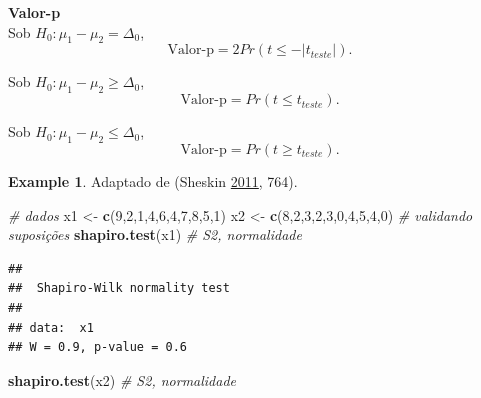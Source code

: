 \documentclass[
]{book}
\newenvironment{Shaded}{\begin{snugshade}}{\end{snugshade}}
\newcommand{\CommentTok}[1]{\textcolor[rgb]{0.56,0.35,0.01}{\textit{#1}}}
\newcommand{\DecValTok}[1]{\textcolor[rgb]{0.00,0.00,0.81}{#1}}
\newcommand{\KeywordTok}[1]{\textcolor[rgb]{0.13,0.29,0.53}{\textbf{#1}}}
\newcommand{\NormalTok}[1]{#1}
\newcommand{\StringTok}[1]{\textcolor[rgb]{0.31,0.60,0.02}{#1}}
\theoremstyle{definition}
\theoremstyle{definition}
\newtheorem{example}{Example}[chapter]
\theoremstyle{definition}
\theoremstyle{remark}
\begin{document}
\textbf{Valor-p}\\
Sob \(H_0: \mu_1-\mu_2 = \Delta_0\),
\begin{equation}
\text{Valor-p} = 2Pr(t \le -|t_{teste}|).
\label{eq:t-teste-medias-dep-p-bi}
\end{equation}

Sob \(H_0: \mu_1-\mu_2 \ge \Delta_0\),
\begin{equation}
\text{Valor-p} = Pr(t \le t_{teste}).
\label{eq:t-teste-medias-dep-p-uni-inf}
\end{equation}

Sob \(H_0: \mu_1-\mu_2 \le \Delta_0\),
\begin{equation}
\text{Valor-p} = Pr(t \ge t_{teste}).
\label{eq:t-teste-medias-dep-p-uni-sup}
\end{equation}

\begin{example}
\protect\hypertarget{exm:t-medias-dep}{}{\label{exm:t-medias-dep} }Adaptado de (Sheskin \protect\hyperlink{ref-sheskin2011handbook}{2011}, 764).
\end{example}

\begin{Shaded}
\begin{Highlighting}[]
\CommentTok{\# dados}
\NormalTok{x1 \textless{}{-}}\StringTok{ }\KeywordTok{c}\NormalTok{(}\DecValTok{9}\NormalTok{,}\DecValTok{2}\NormalTok{,}\DecValTok{1}\NormalTok{,}\DecValTok{4}\NormalTok{,}\DecValTok{6}\NormalTok{,}\DecValTok{4}\NormalTok{,}\DecValTok{7}\NormalTok{,}\DecValTok{8}\NormalTok{,}\DecValTok{5}\NormalTok{,}\DecValTok{1}\NormalTok{)}
\NormalTok{x2 \textless{}{-}}\StringTok{ }\KeywordTok{c}\NormalTok{(}\DecValTok{8}\NormalTok{,}\DecValTok{2}\NormalTok{,}\DecValTok{3}\NormalTok{,}\DecValTok{2}\NormalTok{,}\DecValTok{3}\NormalTok{,}\DecValTok{0}\NormalTok{,}\DecValTok{4}\NormalTok{,}\DecValTok{5}\NormalTok{,}\DecValTok{4}\NormalTok{,}\DecValTok{0}\NormalTok{)}
\CommentTok{\# validando suposições}
\KeywordTok{shapiro.test}\NormalTok{(x1)  }\CommentTok{\# S2, normalidade}
\end{Highlighting}
\end{Shaded}

\begin{verbatim}
## 
##  Shapiro-Wilk normality test
## 
## data:  x1
## W = 0.9, p-value = 0.6
\end{verbatim}

\begin{Shaded}
\begin{Highlighting}[]
\KeywordTok{shapiro.test}\NormalTok{(x2)  }\CommentTok{\# S2, normalidade}
\end{Highlighting}
\end{Shaded}
\end{document}
